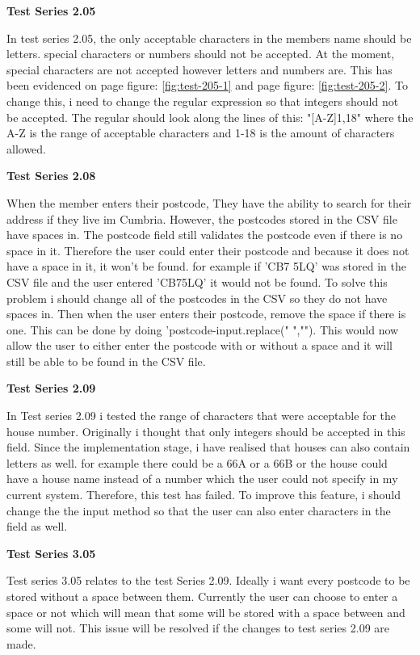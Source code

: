 \textbf{Test Series 2.05}

In test series 2.05, the only acceptable characters in the members name should be letters. special characters or numbers should not be accepted. At the moment, special characters are not accepted however letters and numbers are. This has been evidenced on page \pageref{fig:test-205-1} figure: \ref{fig:test-205-1}  and page \pageref{fig:test-205-2} figure: \ref{fig:test-205-2}. To change this, i need to change the regular expression so that integers should not be accepted. The regular should look along the lines of this: "[A-Z]{1,18}" where the A-Z is the range  of acceptable characters and 1-18 is the amount of characters allowed. 

\textbf{Test Series 2.08}

When the member enters their postcode, They have the ability to search for their address if they live im Cumbria. However, the postcodes stored in the CSV file have spaces in. The postcode field still validates the postcode even if there is no space in it. Therefore the user could enter their postcode and because it does not have a space in it, it won't be found. for example if 'CB7 5LQ' was stored in the CSV file and the user entered 'CB75LQ' it would not be found. To solve this problem i should change all of the postcodes in the CSV so they do not have spaces in. Then when the user enters their postcode, remove the space if there is one. This can be done by doing 'postcode-input.replace(" ",""). This would now allow the user to either enter the postcode with or without a space and it will still be able to be found in the CSV file.

\textbf{Test Series 2.09}

In Test series 2.09 i tested the range of characters that were acceptable for the house number. Originally i thought that only integers should be accepted in this field. Since the implementation stage, i have realised that houses can also contain letters as well. for example there could be a 66A or a 66B or the house could have a house name instead of a number which the user could not specify in my current system. Therefore,  this test has failed. To improve this feature, i should change the the input method so that the user can also enter characters in the field as well.

\textbf{Test Series 3.05}

Test series 3.05 relates to the test Series 2.09. Ideally i want every postcode to be stored without a space between them. Currently the user can choose to enter a space or not which will mean that some will be stored with a space between and some will not. This issue will be resolved if the changes to test series 2.09 are made.

